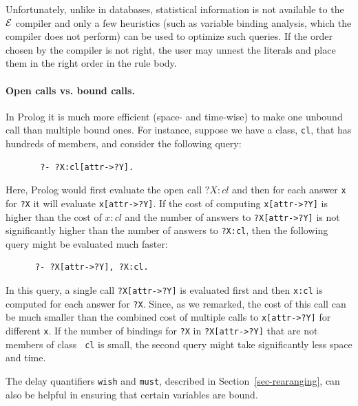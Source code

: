 \documentclass[11pt]{article}
\newcommand{\ERGO}{\mbox{\ensuremath{\cal{E}}\smaller{{\sc{RGO}}}}\xspace}
\newcommand{\FLSYSTEM}{\ERGO}
\begin{document}
Unfortunately, unlike in databases, statistical information is not
available to the \FLSYSTEM compiler and only a few heuristics (such as
variable binding analysis, which the compiler does not perform) can be used
to optimize such queries. If the order chosen by the compiler is not right,
the user may unnest the literals and place them in the right
order in the rule body.

\paragraph{Open calls vs. bound calls.}
In Prolog it is much more efficient (space- and
time-wise) to make one unbound call than multiple bound ones. For instance,
suppose we have a class, {\tt cl}, that has hundreds of members, and
consider the following query:
\begin{verbatim}
       ?- ?X:cl[attr->?Y].  
\end{verbatim}
Here, Prolog would first evaluate the open call $?X:cl$ and then for each
answer {\tt x} for {\tt ?X} it will evaluate {\tt x[attr->?Y]}.
If the cost of computing {\tt x[attr->?Y]} is higher than the cost of $x:cl$
and the number of answers to {\tt ?X[attr->?Y]} is not significantly
higher than the number of answers to {\tt ?X:cl}, then the following query
might be evaluated much faster:
\begin{verbatim}
      ?- ?X[attr->?Y], ?X:cl.  
\end{verbatim}
In this query, a single call {\tt ?X[attr->?Y]} is evaluated first and then
{\tt x:cl} is computed for each answer for {\tt ?X}.  Since, as we remarked,
the cost of this call can be much smaller than the combined cost of
multiple calls to {\tt x[attr->?Y]} for different {\tt x}.  If the number of
bindings for {\tt ?X} in {\tt ?X[attr->?Y]} that are not members of class {\tt
  cl} is small, the second query might take significantly less space and
time.

The delay quantifiers \texttt{wish} and \texttt{must}, described in
Section~\ref{sec-rearanging}, can also be helpful
in ensuring that certain variables are bound.  
\end{document}
